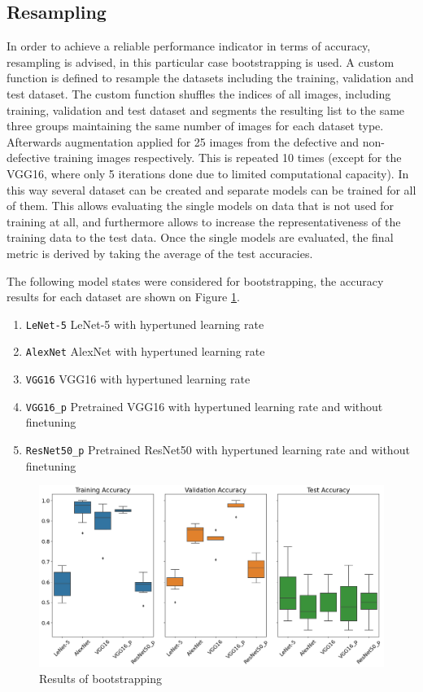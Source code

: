 \documentclass[10pt, final]{article}
\begin{document}
\subsection{Resampling}
In order to achieve a reliable performance indicator in terms of accuracy, resampling is advised, in this particular
case bootstrapping is used.
A custom function is defined to resample the datasets including the training, validation and test dataset.
The custom function shuffles the indices of all images, including training, validation and test dataset and segments
the resulting list to the same three groups maintaining the same number of images for each dataset type.
Afterwards augmentation applied for 25 images from the defective and non-defective training images respectively.
This is repeated 10 times (except for the VGG16, where only 5 iterations done due to limited computational capacity).
In this way several dataset can be created and separate models can be trained for all of them.
This allows evaluating the single models on data that is not used for training at all, and furthermore allows to increase
the representativeness of the training data to the test data.
Once the single models are evaluated, the final metric is derived by taking the average of the test accuracies.

The following model states were considered for bootstrapping, the accuracy results for each dataset are shown on
Figure \ref{fig:bootstrap_results}.

\begin{enumerate}
	\item \lstinline{LeNet-5} LeNet-5 with hypertuned learning rate
	\item \lstinline{AlexNet} AlexNet with hypertuned learning rate
	\item \lstinline{VGG16} VGG16 with hypertuned learning rate
	\item \lstinline{VGG16_p} Pretrained VGG16 with hypertuned learning rate and without finetuning
	\item \lstinline{ResNet50_p} Pretrained ResNet50 with hypertuned learning rate and without finetuning
\end{enumerate}

\begin{figure}[!ht]
	\centering
	\includegraphics[width=\textwidth]{./tex_graphs/bootstrap_results.png}
	\caption{Results of bootstrapping}
	\label{fig:bootstrap_results}
\end{figure}
\end{document}
